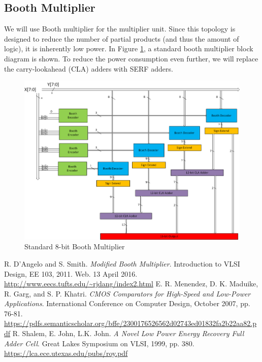 \documentclass{memo}
\begin{document}
\subsection{Booth Multiplier}
We will use Booth multiplier for the multiplier unit. Since this topology is designed to reduce the number of partial products (and thus the amount of logic), it is inherently low power. In Figure \ref{fig:booth-multiplier}, a standard booth multiplier block diagram is shown. To reduce the power consumption even further, we will replace the carry-lookahead (CLA) adders with SERF adders.
\begin{figure}[h]
    \centering
    \includegraphics[scale=0.5]{booth-multiplier.png}
    \caption{Standard 8-bit Booth Multiplier \cite{dangelo}}
    \label{fig:booth-multiplier}
\end{figure}

\newpage

\begin{thebibliography}{9}
    R. D'Angelo and S. Smith. \textit{Modified Booth Multiplier}. Introduction to VLSI Design, EE 103, 2011. Web. 13 April 2016. \\ \url{http://www.eecs.tufts.edu/~rjdang/index2.html}
    E. R. Menendez, D. K. Maduike, R. Garg, and S. P. Khatri. \textit{CMOS Comparators for High-Speed and Low-Power Applications}. International Conference on Computer Design, October 2007, pp. 76-81. \\ \url{https://pdfs.semanticscholar.org/bffe/2300176526562d02743ed01832fa2b22aa82.pdf}
    R. Shalem, E. John, L.K. John. \textit{A Novel Low Power Energy Recovery Full Adder Cell}. Great Lakes Symposium on VLSI,  1999, pp. 380. \\ \url{https://lca.ece.utexas.edu/pubs/roy.pdf}
\end{thebibliography}
\end{document}
